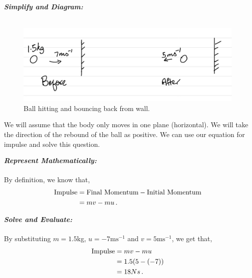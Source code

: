 \begin{subquestions}
\textbf{\textit{Simplify and Diagram:}} \\ \\
\begin{figure}[H]
	\begin{center}
		\includegraphics[scale=0.25]{../2013/figures/2013q6-2}
		\caption{\label{2013:q6:Diagram2} Ball hitting and bouncing back from wall.}
	\end{center}
\end{figure}	
We will assume that the body only moves in one plane (horizontal). We will take the direction of the rebound of the ball as positive. We can use our equation for impulse and solve this question.




\textbf{\textit{Represent Mathematically:}} \\ \\
By definition, we know that,
\begin{align}
	\text{Impulse} & = \text{Final Momentum} - \text{Initial Momentum} \nonumber \\ 
	               & = mv - mu \,.
\end{align}




\textbf{\textit{Solve and Evaluate:}} \\ \\
By substituting $m=1.5$kg, $u=-7\text{ms}^{-1}$ and $v=5\text{ms}^{-1}$, we get that,
\begin{align}
	\text{Impulse} & = mv-mu \nonumber \\
	               & = 1.5(5-(-7)) \nonumber \\
	               & = 18Ns \,.
\end{align}


\subquestion


\end{subquestions}
